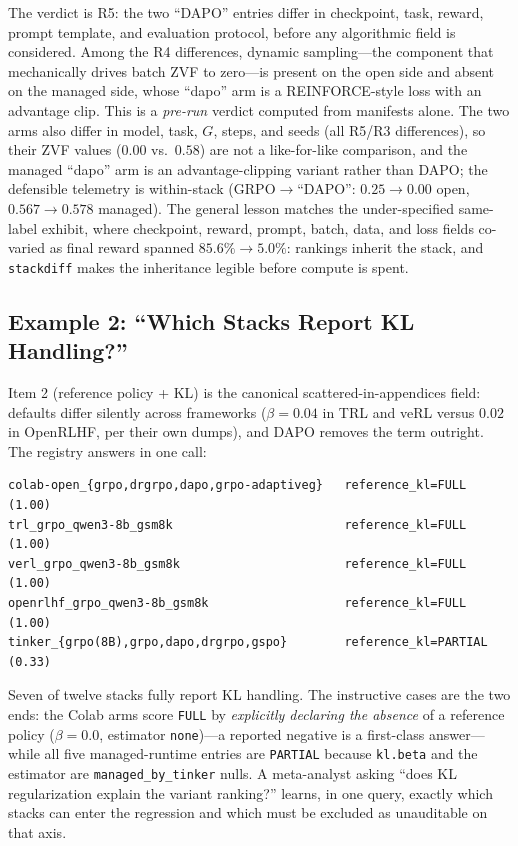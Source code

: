 The verdict is R5: the two ``DAPO'' entries differ in checkpoint, task,
reward, prompt template, and evaluation protocol, before any algorithmic
field is considered. Among the R4 differences, dynamic sampling---the component
that mechanically drives batch ZVF to zero---is present on the open side and
absent on the managed side, whose ``dapo'' arm is a REINFORCE-style loss with
an advantage clip. This is a
\emph{pre-run} verdict computed from manifests alone. The two arms also differ
in model, task, $G$, steps, and seeds (all R5/R3 differences), so their ZVF
values ($0.00$ vs.\ $0.58$) are not a like-for-like comparison, and the
managed ``dapo'' arm is an advantage-clipping variant rather than DAPO; the
defensible telemetry is within-stack (GRPO$\to$``DAPO'': $0.25\to0.00$ open,
$0.567\to0.578$ managed). The general lesson matches the under-specified
same-label exhibit, where checkpoint, reward, prompt, batch, data, and loss
fields co-varied as final reward spanned $85.6\% \to 5.0\%$: rankings
inherit the stack, and \texttt{stackdiff} makes the inheritance legible
before compute is spent.

\subsection{Example 2: ``Which Stacks Report KL Handling?''}
\label{sec:p6-worked-kl}
Item 2 (reference policy + KL) is the canonical scattered-in-appendices
field: defaults differ silently across frameworks ($\beta{=}0.04$ in TRL and
veRL versus $0.02$ in OpenRLHF, per their own dumps), and DAPO removes the
term outright. The registry answers in one call:

\begin{lstlisting}[basicstyle=\ttfamily\scriptsize, frame=single,
  caption={\texttt{query --item reference_kl} on the seed entries
  (grouped).}, label={lst:p6-klquery}]
colab-open_{grpo,drgrpo,dapo,grpo-adaptiveg}   reference_kl=FULL (1.00)
trl_grpo_qwen3-8b_gsm8k                        reference_kl=FULL (1.00)
verl_grpo_qwen3-8b_gsm8k                       reference_kl=FULL (1.00)
openrlhf_grpo_qwen3-8b_gsm8k                   reference_kl=FULL (1.00)
tinker_{grpo(8B),grpo,dapo,drgrpo,gspo}        reference_kl=PARTIAL (0.33)
\end{lstlisting}

Seven of twelve stacks fully report KL handling. The instructive cases are the
two ends: the Colab arms score \texttt{FULL} by \emph{explicitly declaring the
absence} of a reference policy ($\beta{=}0.0$, estimator \texttt{none})---a
reported negative is a first-class answer---while all five managed-runtime
entries are \texttt{PARTIAL} because \texttt{kl.beta} and the estimator are
\texttt{managed_by_tinker} nulls. A meta-analyst asking ``does KL
regularization explain the variant ranking?'' learns, in one query, exactly
which stacks can enter the regression and which must be excluded as
unauditable on that axis.

